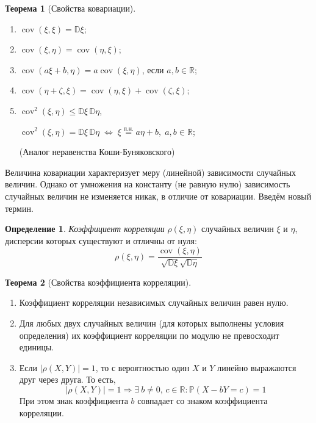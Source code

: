\documentclass[oneside,final,14pt]{extreport}
\theoremstyle{plain}
\theoremstyle{definition}
\newtheorem*{defn}{Определение}
\theoremstyle{named}
\newtheorem*{namedthm}{Теорема}
\begin{document}
\begin{namedthm}[Свойства ковариации]\leavevmode
    \begin{enumerate}
        \item $\operatorname{cov}(\xi, \xi)=\mathbb{D} \xi$;
        \item $\operatorname{cov}(\xi, \eta)=\operatorname{cov}(\eta, \xi)$;
        \item $\operatorname{cov}(a \xi + b, \eta)=a \operatorname{cov}(\xi, \eta)$, если $a, b \in \mathbb{R}$;
        \item $\operatorname{cov}(\eta + \zeta, \xi) = 
        \operatorname{cov}(\eta, \xi) + \operatorname{cov}(\zeta, \xi)$;
        \item $\operatorname{cov}^2(\xi, \eta) \leqslant \mathbb{D}\xi \, \mathbb{D}\eta$,
        
        $\operatorname{cov}^2(\xi, \eta) = \mathbb{D}\xi \,\mathbb{D}\eta \; \Leftrightarrow \; \xi \overset{\text{п.н.}}{=} a\eta + b, \; a, b \in \mathbb{R}$;
        
        (Аналог неравенства Коши-Буняковского)
    \end{enumerate}
\end{namedthm}

Величина ковариации характеризует меру (линейной) зависимости случайных величин. Однако от умножения на константу (не равную нулю) зависимость случайных величин не изменяется никак, в отличие от ковариации. Введём новый термин.

\begin{defn}
    {\it Коэффициент корреляции} $\rho(\xi,\eta)$ случайных величин $\xi$ и $\eta$, дисперсии которых существуют и отличны от нуля:
    \begin{equation*}
        \rho(\xi, \eta)=\frac{\operatorname{cov}(\xi, \eta)}{\sqrt{\mathbb{D} \xi} \sqrt{\mathbb{D} \eta}}
    \end{equation*}
\end{defn}

\begin{namedthm}[Свойства коэффициента корреляции]\leavevmode
    \begin{enumerate}
        \item Коэффициент корреляции независимых случайных величин равен нулю.
        \item Для любых двух случайных величин (для которых выполнены условия определения) их коэффициент корреляции по модулю не превосходит единицы.
        \item Если $|\rho(X,Y)| = 1$, то с вероятностью один $X$ и $Y$ линейно выражаются друг через друга. То есть,
        \begin{equation*}
            |\rho(X, Y)|=1 \Longrightarrow \exists \: b \neq 0, \, c \in \mathbb{R}: \mathbb{P}(X-b Y=c)=1
        \end{equation*}
        При этом знак коэффициента $b$ совпадает со знаком коэффициента корреляции.
    \end{enumerate}
\end{namedthm}
\end{document}

